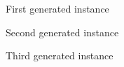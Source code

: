 \documentclass[a4paper]{article}
\begin{document}
\begin{figure}[h]
\centering
\vspace*{\fill}
\noindent{}%
\caption {First generated instance}
\vspace*{0.5cm}
\end{figure}

\begin{figure}[h]
\centering
\vspace*{\fill}
\noindent{}%
\caption {Second generated instance}
\vspace*{0.5cm}
\end{figure}

\begin{figure}[h]
\centering
\vspace*{\fill}
\noindent{}%
\caption {Third generated instance}
\vspace*{0.5cm}
\end{figure}
\end{document}
